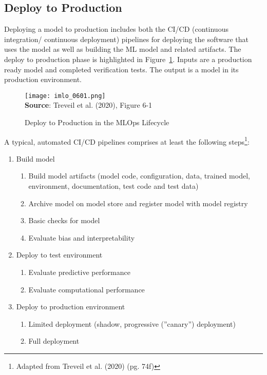 \subsection{Deploy to Production}

Deploying a model to production includes both the CI/CD (continuous integration/ continuous deployment) pipelines for deploying the software that uses the model as well as building the ML model and related artifacts. The deploy to production phase is highlighted in Figure~\ref{fig:deploytoproduction}. Inputs are a production ready model and completed verification tests. The output is a model in its production environment. 

\begin{figure}[h]
\centering
\texttt{[image: imlo\_0601.png]} \\

\vspace{\baselineskip}
\scriptsize \textbf{Source}: Treveil et al. (2020), Figure 6-1
\caption{Deploy to Production in the MLOps Lifecycle}
\label{fig:deploytoproduction}
\end{figure}

A typical, automated CI/CD pipelines comprises at least the following steps\footnote{Adapted from Treveil et al. (2020) (pg. 74f)}:

\begin{samepage}
\begin{enumerate}
\item Build model
\begin{enumerate}
   \item Build model artifacts (model code, configuration, data, trained model, environment, documentation, test code and test data)
   \item Archive model on model store and register model with model registry
   \item Basic checks for model
   \item Evaluate bias and interpretability 
\end{enumerate}
\item Deploy to test environment
\begin{enumerate}
    \item Evaluate predictive performance
    \item Evaluate computational performance
\end{enumerate}
\item Deploy to production environment
\begin{enumerate}
   \item Limited deployment (shadow, progressive (''canary'') deployment)
   \item Full deployment
\end{enumerate}
\end{enumerate} 
\end{samepage}

